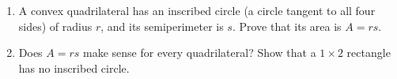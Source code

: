 \begin{enumerate}
\item[(a)] A convex quadrilateral has an inscribed circle (a circle tangent to all four sides) of radius $r$, and its semiperimeter is $s$. Prove that its area is $A=rs$.
\item[(b)] Does $A=rs$ make sense for every quadrilateral? Show that a $1\times2$ rectangle has no inscribed circle.
\end{enumerate}
